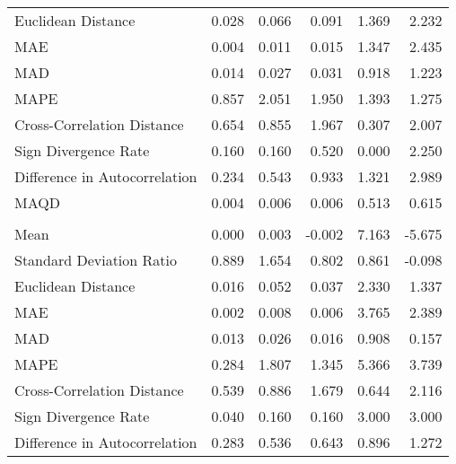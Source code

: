 \begin{landscape}
\begin{ThreePartTable}
\begin{longtable}[t]{lrrrrr}
\hspace{1em}Euclidean Distance & 0.028 & 0.066 & 0.091 & 1.369 & 2.232\\
\hspace{1em}MAE & 0.004 & 0.011 & 0.015 & 1.347 & 2.435\\
\hspace{1em}MAD & 0.014 & 0.027 & 0.031 & 0.918 & 1.223\\
\hspace{1em}MAPE & 0.857 & 2.051 & 1.950 & 1.393 & 1.275\\
\hspace{1em}Cross-Correlation Distance & 0.654 & 0.855 & 1.967 & 0.307 & 2.007\\
\hspace{1em}Sign Divergence Rate & 0.160 & 0.160 & 0.520 & 0.000 & 2.250\\
\hspace{1em}Difference in Autocorrelation & 0.234 & 0.543 & 0.933 & 1.321 & 2.989\\
\hspace{1em}MAQD & 0.004 & 0.006 & 0.006 & 0.513 & 0.615\\
\addlinespace[0.5em]
\multicolumn{6}{l}{\textbf{DEU}}\\
\hline
\hspace{1em}Mean & 0.000 & 0.003 & -0.002 & 7.163 & -5.675\\
\hspace{1em}Standard Deviation Ratio & 0.889 & 1.654 & 0.802 & 0.861 & -0.098\\
\hspace{1em}Euclidean Distance & 0.016 & 0.052 & 0.037 & 2.330 & 1.337\\
\hspace{1em}MAE & 0.002 & 0.008 & 0.006 & 3.765 & 2.389\\
\hspace{1em}MAD & 0.013 & 0.026 & 0.016 & 0.908 & 0.157\\
\hspace{1em}MAPE & 0.284 & 1.807 & 1.345 & 5.366 & 3.739\\
\hspace{1em}Cross-Correlation Distance & 0.539 & 0.886 & 1.679 & 0.644 & 2.116\\
\hspace{1em}Sign Divergence Rate & 0.040 & 0.160 & 0.160 & 3.000 & 3.000\\
\hspace{1em}Difference in Autocorrelation & 0.283 & 0.536 & 0.643 & 0.896 & 1.272\\

\end{longtable}
\end{ThreePartTable}
\end{landscape}
